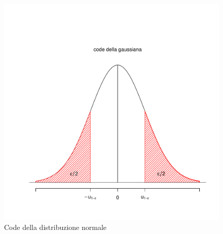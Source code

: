 \documentclass[onecolumn,12pt]{book}\usepackage[]{graphicx}\usepackage[]{color}
\makeatletter
\def\maxwidth{ %
  \ifdim\Gin@nat@width>\linewidth
    \linewidth
  \else
    \Gin@nat@width
  \fi
}
\newenvironment{knitrout}{}{} %
\makeatother
\begin{document}
\begin{figure}[H]
\begin{center}

\begin{knitrout}
\color{fgcolor}
\includegraphics[width=\maxwidth]{figure/unnamed-chunk-148-1} 

\end{knitrout}
\caption{Code della distribuzione normale}
\label{fig:normaletratto}
\end{center}
\end{figure}
\end{document}
